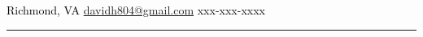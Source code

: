\documentclass[10pt,A4]{article}
\begin{document}
\pagestyle{fancy}	

\begin{minipage}[c][0.085\textheight][t]{\linewidth}
\begin{center}
	\vspace{14pt}
	\textcolor{black}{\small{  Richmond, VA  \hspace{12pt}    \href{mailto:davidh804@gmail.com}{davidh804@gmail.com}  \hspace{12pt}     xxx-xxx-xxxx}} \\ \hspace{22pt}
        \hspace{16pt}\textcolor{sectcol}{\rule[-1mm]{2pt}{0.9cm}}\hspace{12pt}
\end{center}
\end{minipage}\\[-4pt]
\end{document}
